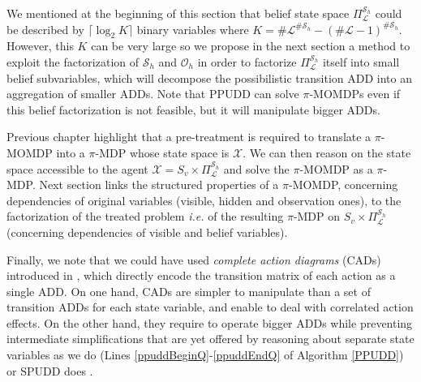 We mentioned at the beginning of this section 
that belief state space $\Pi^{\mathcal{S}_h}_{\mathcal{L}}$
could be described by $\lceil \log_2 K \rceil$ binary variables where $K=\#
\mathcal{L}^{\#\mathcal{S}_h} - (\# \mathcal{L}-1)^{\# \mathcal{S}_h}$. 
However, this $K$ can be
very large so we propose 
in the next section a method to exploit the
factorization of $\mathcal{S}_h$ and $\mathcal{O}_h$ 
in order to factorize $\Pi^{\mathcal{S}_h}_{\mathcal{L}}$
itself into small belief subvariables, which will decompose the possibilistic
transition ADD into an aggregation of smaller ADDs.
Note that PPUDD can solve $\pi$-MOMDPs even if this belief factorization is not 
feasible, but it will manipulate bigger ADDs.

Previous chapter highlight that 
a pre-treatment is required to translate
a $\pi$-MOMDP into a $\pi$-MDP whose state space is $\mathcal{X}$.
We can then reason on the state space accessible to the agent 
$\mathcal{X} = S_v \times \Pi^{\mathcal{S}_h}_{\mathcal{L}}$ and
solve the $\pi$-MOMDP as a $\pi$-MDP.
Next section links the structured properties of a $\pi$-MOMDP,
concerning dependencies of original variables (visible, hidden and observation ones), 
to the factorization of the treated problem \textit{i.e.} of the resulting $\pi$-MDP 
on $S_v \times \Pi^{\mathcal{S}_h}_{\mathcal{L}}$ (concerning dependencies of visible and belief variables).

Finally, we note that we could have used \emph{complete action diagrams} (CADs)
introduced in \cite{conf/nips/St-AubinHB00}, which directly encode the
transition matrix of each action as a single ADD.
On one hand, CADs are simpler
to manipulate than a set of transition ADDs for each state variable, and enable
to deal with correlated action effects. On the other hand,
they require to
operate bigger ADDs while preventing intermediate simplifications that are yet
offered by reasoning about separate state variables as we do (Lines
\ref{ppuddBeginQ}-\ref{ppuddEndQ} of Algorithm \ref{PPUDD}) or SPUDD does
\cite{Hoey99spudd:stochastic}.

